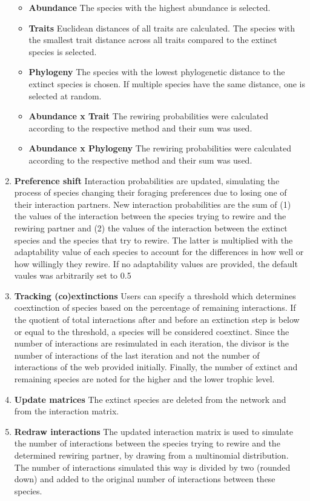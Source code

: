 \documentclass[12pt,a4paper]{article}
\begin{document}
\begin{enumerate}
		\begin{itemize}
		\item \label{itm:abund_rew} \textbf{Abundance} {\small The species with the highest abundance is selected.}
		\item \label{itm:trait_rew} \textbf{Traits} {\small Euclidean distances of all traits are calculated. The species with the smallest trait distance across all traits compared to the extinct species is selected.}
		\item \label{itm:phylo_rew} \textbf{Phylogeny} {\small The species with the lowest phylogenetic distance to the extinct species is chosen. If multiple species have the same distance, one is selected at random.}
		\item \label{itm:AT_rew} \textbf{Abundance x Trait} {\small The rewiring probabilities were calculated according to the respective method and their sum was used.}
		\item \label{itm:AP_rew} \textbf{Abundance x Phylogeny} {\small The rewiring probabilities were calculated according to the respective method and their sum was used.}
		\end{itemize}
	\item \label{itm:shift} \textbf{Preference shift} {\small Interaction probabilities are updated, simulating the process of species changing their foraging preferences due to losing one of their interaction partners. New interaction probabilities are the sum of (1) the values of the interaction between the species trying to rewire and the rewiring partner and (2) the values of the interaction between the extinct species and the species that try to rewire. The latter is multiplied with the adaptability value of each species to account for the differences in how well or how willingly they rewire. If no adaptability values are provided, the default vaules was arbitrarily set to 0.5}
	\item  \label{itm:track} \textbf{Tracking (co)extinctions} {\small Users can specify a threshold which determines coextinction of species based on the percentage of remaining interactions. If the quotient of total interactions after and before an extinction step is below or equal to the threshold, a species will be considered coextinct. Since the number of interactions are resimulated in each iteration, the divisor is the number of interactions of the last iteration and not the number of interactions of the web provided initially. Finally, the number of extinct and remaining species are noted for the higher and the lower trophic level.}
	\item \label{itm:update} \textbf{Update matrices} {\small The extinct species are deleted from the network and from the interaction matrix.}
	\item \label{itm:redraw} \textbf{Redraw interactions} {\small The updated interaction matrix is used to simulate the number of interactions between the species trying to rewire and the determined rewiring partner, by drawing from a multinomial distribution. The number of interactions simulated this way is divided by two (rounded down) and added to the original number of interactions between these species.}
	\end{enumerate}
\end{document}
